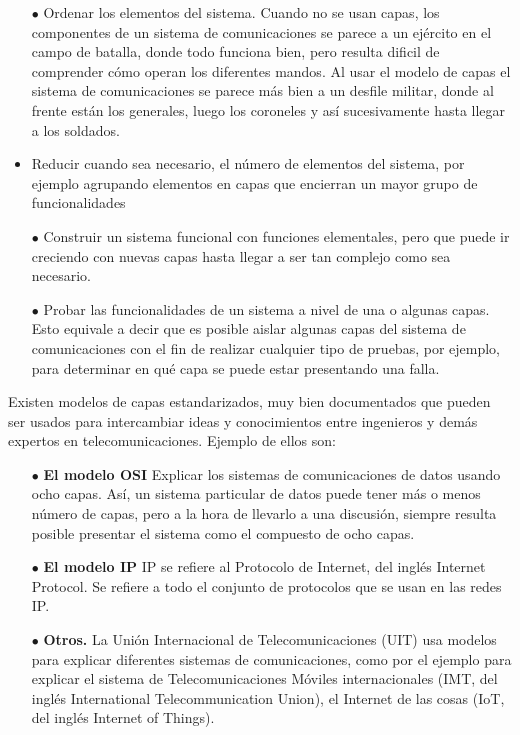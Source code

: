 \begin{itemize}
	\item[$\bullet$] Ordenar los elementos del sistema. Cuando no se usan capas, los componentes de un sistema de comunicaciones se parece a un ejército en el campo de batalla, donde todo funciona bien, pero resulta dificil de comprender cómo operan los diferentes mandos. Al usar el modelo de capas el sistema de comunicaciones se parece más bien a un desfile militar, donde al frente están los generales, luego los coroneles y así sucesivamente hasta llegar a los soldados.  
	\item  Reducir cuando sea necesario, el número de elementos del sistema, por ejemplo agrupando elementos en capas que encierran un mayor grupo de funcionalidades
    \item[$\bullet$] Construir un sistema funcional con funciones elementales, pero que puede ir creciendo con nuevas capas hasta llegar a ser tan complejo como sea necesario.
    \item[$\bullet$] Probar las funcionalidades de un sistema a nivel de una o algunas capas. Esto equivale a decir que es posible aislar algunas capas del sistema de comunicaciones con el fin de realizar cualquier tipo de pruebas, por ejemplo, para determinar en qué capa se puede estar presentando una falla.
\end{itemize}

Existen modelos de capas estandarizados, muy bien documentados que pueden ser usados para intercambiar ideas y conocimientos entre ingenieros y demás expertos en telecomunicaciones. Ejemplo de ellos son:
\begin{itemize}
	\item[$\bullet$] \textbf{El modelo OSI} Explicar los sistemas de comunicaciones de datos usando ocho capas. Así, un sistema particular de datos puede tener más o menos número de capas, pero a la hora de llevarlo a una discusión, siempre resulta posible presentar el sistema como el compuesto de ocho capas.
    \item[$\bullet$] \textbf{El modelo IP} IP se refiere al Protocolo de Internet, del inglés Internet Protocol. Se refiere a todo el conjunto de protocolos que se usan en las redes IP.
    \item[$\bullet$] \textbf{Otros.} La Unión Internacional de Telecomunicaciones (UIT) usa modelos para explicar diferentes sistemas de comunicaciones, como por el ejemplo para explicar el sistema de Telecomunicaciones Móviles internacionales (IMT, del inglés International Telecommunication Union), el Internet de las cosas (IoT, del inglés Internet of Things).
\end{itemize}

